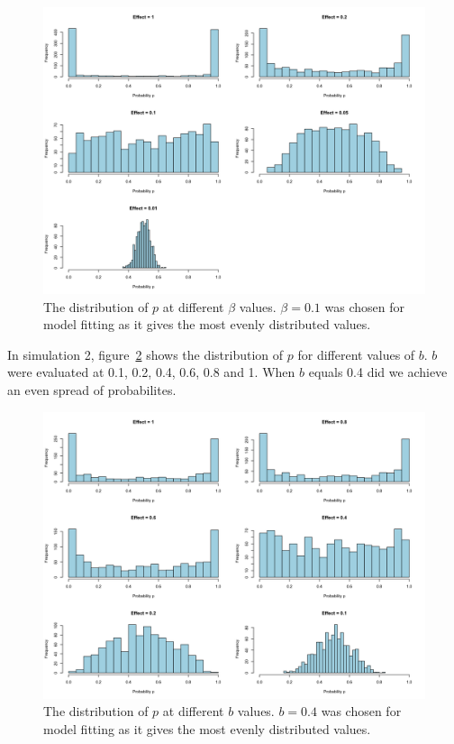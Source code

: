 \documentclass[12pt]{article}
\begin{document}
\begin{figure}[H] 
	\centering
	\includegraphics[width=\textwidth]{../Figures/sim1_p_dist.png} 
	\caption{The distribution of \(p\) at different \(\beta\) values. \(\beta = 0.1\) was
chosen for model fitting as it gives the most evenly distributed values.}
	\label{fig:sim1_p_dist} 
\end{figure}

In simulation 2, figure~\ref{fig:sim2_p_dist} shows the distribution of \( p \)
for different values of \( b \). \( b \) were evaluated at 0.1, 0.2, 0.4, 0.6,
0.8 and 1. When \( b \) equals 0.4 did we achieve an even spread of
probabilites.

\begin{figure}[H] 
	\centering
	\includegraphics[width=\textwidth]{../Figures/sim2_p_dist.png} 
	\caption{The distribution of \(p\) at different \( b \) values. \( b = 0.4 \) was
chosen for model fitting as it gives the most evenly distributed values.}
	\label{fig:sim2_p_dist} 
\end{figure}
\end{document}
